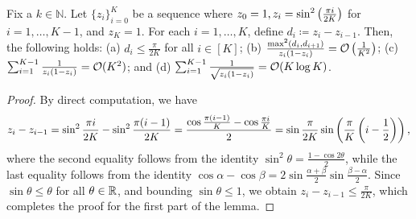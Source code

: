 \begin{lemma}\label{lem:discretization}
Fix a $k \in \mathbb{N}$. Let $\{z_{i}\}_{i = 0} ^ {K}$ be a sequence where $z_{0} = 1, z_{i} = \sin ^ {2} \left( \frac{\pi i}{2K} \right)$ for $i = 1, \dots, K - 1$, and $z_{K} = 1$. For each $i = 1, \dots, K$, define $d_{i} \coloneqq z_{i} - z_{i - 1}$. Then, the following holds: (a) $d_{i} \le {\frac{\pi}{2K}}$ for all $i \in [K]$; (b) $\frac{\max ^ {2}(d_{i}, d_{i + 1})}{z_{i}(1 - z_{i})} = \mathcal{O}\left( \frac{1}{K ^ {2}} \right)$; (c) $\sum_{i = 1} ^ {K - 1} \frac{1}{z_{i}(1 - z_{i})} = \mathcal{O}(K ^ {2})$; and (d) $\sum_{i = 1} ^ {K - 1} \frac{1}{\sqrt{z_{i}(1 - z_{i})}} = \mathcal{O}(K \log K)$.
\end{lemma}
\begin{proof}
    By direct computation, we have \begin{align}\label{eq:bound_diff}
        z_{i} - z_{i - 1} = \sin ^ {2} {\frac{\pi i}{2K}} - \sin ^ {2} {\frac{\pi(i - 1)}{2K}} = \frac{\cos {\frac{\pi(i - 1)}{K}} - \cos {\frac{\pi i}{K}}}{2} = \sin {\frac{\pi}{2K}} \sin \left( \frac{\pi}{K} \left( i - \frac{1}{2} \right) \right),
    \end{align}
    where the second equality follows from the identity $\sin ^ {2} \theta = \frac{1 - \cos 2\theta}{2}$, while the last equality follows from the identity $\cos \alpha - \cos \beta = 2 \sin \frac{\alpha + \beta}{2} \sin \frac{\beta - \alpha}{2}$. Since $\sin \theta \le \theta$ for all $\theta \in {\mathbb{R}}$, and bounding $\sin \theta \le 1$, we obtain $z_{i} - z_{i - 1} \le \frac{\pi}{2K}$, which completes the proof for the first part of the lemma. 
    

\end{proof}
